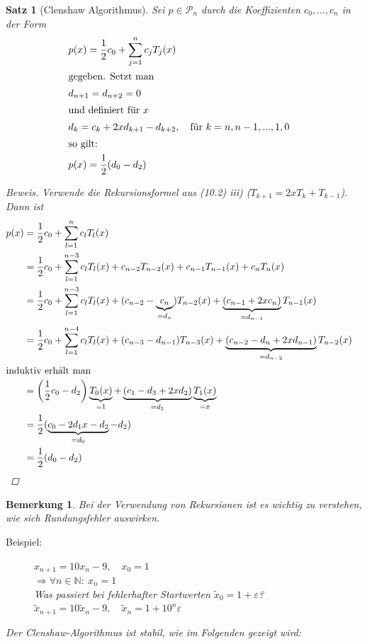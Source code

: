 \documentclass[12pt]{article}
\theoremstyle{break}
\newtheorem{theorem}{Satz}[subsection]
\newtheorem*{comment*}{Bemerkung}
\begin{document}
\begin{theorem}[Clenshaw Algorithmus]
Sei $p \in \mathcal{P}_n$ durch die Koeffizienten $c_0, ..., c_n$ in der Form
\begin{align*}
&p(x) = \frac{1}{2} c_0 + \sum_{j=1}^n c_j T_j(x)&\\
\intertext{gegeben. Setzt man }
&d_{n+1} = d_{n+2} = 0 &\\
\intertext{und definiert für $x$}
&d_k = c_k + 2x d_{k+1} - d_{k+2}, \quad \text{für }k=n,n-1,...,1, 0&\\
\intertext{so gilt:}
&p(x) = \frac{1}{2} (d_0-d_2)&\\
\end{align*}
\begin{proof}[Beweis]
Verwende die Rekursionsformel aus (10.2) iii) ($T_{k+1} = 2x T_k + T_{k-1}$). Dann ist 
\begin{align*}
p(x) &= \frac{1}{2} c_0 + \sum_{l=1}^n c_l T_l(x) &\\
&= \frac{1}{2} c_0 + \sum_{l=1}^{n-3} c_l T_l(x) + c_{n-2} T_{n-2}(x) + c_{n-1} T_{n-1}(x) + c_{n} T_{n}(x) &\\
&= \frac{1}{2} c_0 + \sum_{l=1}^{n-3} c_l T_l(x) + (c_{n-2} - \underbrace{c_n}_{=d_n}) T_{n-2}(x) + \underbrace{(c_{n-1} + 2xc_n)}_{=d_{n-1}} T_{n-1}(x) &\\
&= \frac{1}{2} c_0 + \sum_{l=1}^{n-4} c_l T_l(x) + (c_{n-3} - d_{n-1}) T_{n-3}(x) + \underbrace{(c_{n-2} - d_n + 2xd_{n-1})}_{=d_{n-2}} T_{n-2}(x) &\\
\intertext{induktiv erhält man}
&= \left(\frac{1}{2} c_0 - d_2\right) \underbrace{T_0(x)}_{=1} + \underbrace{(c_1 - d_3 + 2xd_2)}_{=d_1} \underbrace{T_1(x)}_{=x} &\\
&= \frac{1}{2} (\underbrace{c_0 - 2d_1x - d_2}_{=d_0} -d_2) &\\
&= \frac{1}{2} (d_0-d_2)
\end{align*}
\end{proof}
\end{theorem}

\begin{comment*}
Bei der Verwendung von Rekursionen ist es wichtig zu verstehen, wie sich Rundungsfehler auswirken. 
\begin{description}
  \item[Beispiel:]
    $x_{n+1} = 10x_n - 9, \quad x_0 = 1$ \\
    $ \Rightarrow \forall n \in \mathbb{N}: \medspace x_n = 1$ \\
    Was passiert bei fehlerhafter Startwerten $\tilde{x}_0 = 1+ \varepsilon$? \\
    $ \tilde{x}_{n+1} = 10 \tilde{x}_n - 9, \quad \tilde{x}_n = 1+ 10^n \varepsilon$
\end{description}
Der Clenshaw-Algorithmus ist stabil, wie im Folgenden gezeigt wird:
\end{comment*}
\end{document}
